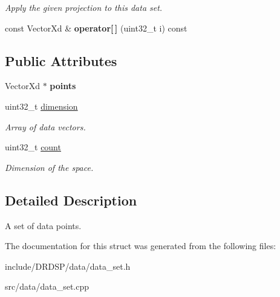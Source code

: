 \begin{DoxyCompactItemize}
\begin{DoxyCompactList}\small\item\em Apply the given projection to this data set. \end{DoxyCompactList}\item 
\hypertarget{struct_d_r_d_s_p_1_1_data_set_a1349d1989fe1292e4c8e7ce4eb105b6c}{const Vector\-Xd \& {\bfseries operator\mbox{[}$\,$\mbox{]}} (uint32\-\_\-t i) const }\label{struct_d_r_d_s_p_1_1_data_set_a1349d1989fe1292e4c8e7ce4eb105b6c}

\end{DoxyCompactItemize}
\subsection*{Public Attributes}
\begin{DoxyCompactItemize}
\item 
\hypertarget{struct_d_r_d_s_p_1_1_data_set_a3b7ec561a02546bc111bd2ad69146cb7}{Vector\-Xd $\ast$ {\bfseries points}}\label{struct_d_r_d_s_p_1_1_data_set_a3b7ec561a02546bc111bd2ad69146cb7}

\item 
\hypertarget{struct_d_r_d_s_p_1_1_data_set_aa2598262725329c137e03b8947638780}{uint32\-\_\-t \hyperlink{struct_d_r_d_s_p_1_1_data_set_aa2598262725329c137e03b8947638780}{dimension}}\label{struct_d_r_d_s_p_1_1_data_set_aa2598262725329c137e03b8947638780}

\begin{DoxyCompactList}\small\item\em Array of data vectors. \end{DoxyCompactList}\item 
\hypertarget{struct_d_r_d_s_p_1_1_data_set_a5e6912a9f2017bb2c97840a5d379c882}{uint32\-\_\-t \hyperlink{struct_d_r_d_s_p_1_1_data_set_a5e6912a9f2017bb2c97840a5d379c882}{count}}\label{struct_d_r_d_s_p_1_1_data_set_a5e6912a9f2017bb2c97840a5d379c882}

\begin{DoxyCompactList}\small\item\em Dimension of the space. \end{DoxyCompactList}\end{DoxyCompactItemize}


\subsection{Detailed Description}
A set of data points. 

The documentation for this struct was generated from the following files\-:\begin{DoxyCompactItemize}
\item 
include/\-D\-R\-D\-S\-P/data/data\-\_\-set.\-h\item 
src/data/data\-\_\-set.\-cpp\end{DoxyCompactItemize}
